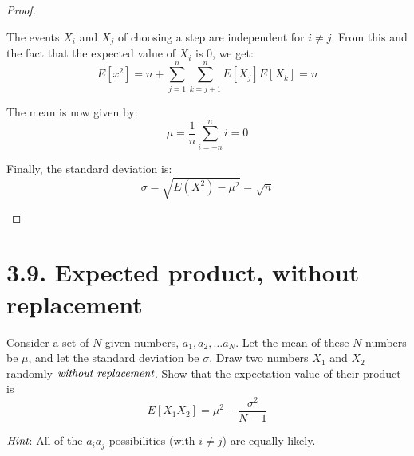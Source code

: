 \begin{proof}
\begin{enumerate}[(a)]
            The events $X_i$ and $X_j$ of choosing a step are independent for $i \neq j$. From
            this and the fact that the expected value of $X_i$ is 0, we get:
             \[
                 E[x^2]= n + \sum_{j = 1}^n\sum_{k = j+1}^n E[X_j]E[X_k] = n
            \] 

            The mean is now given by:
            \[
            \mu = \frac{1}{n}\sum_{i = -n}^n i = 0
            \] 

            Finally, the standard deviation is:
            \[
                \sigma = \sqrt{E(X^2) - \mu^2} = \sqrt{n}
            \] 
    \end{enumerate}
\end{proof}

\section*{3.9. Expected product, without replacement}
Consider a set of $N$ given numbers, $a_1, a_2, \ldots a_N$. Let the mean of these $N$ numbers
be $\mu$, and let the standard deviation be $\sigma$. Draw two numbers $X_1$ and $X_2$ 
randomly $\emph{without replacement}$. Show that the expectation value of their
product is 
\begin{equation*}\tag{3.90}
    E[X_1X_2] = \mu^2 - \frac{\sigma^2}{N - 1}
\end{equation*}

$\emph{Hint}$: All of the $a_ia_j$ possibilities (with $i \neq j$) are equally likely.

\vspace{1em}

